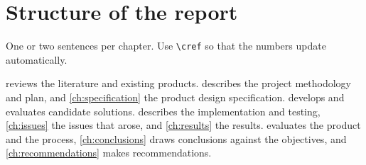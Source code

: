 \section{Structure of the report}
\label{sec:structure}

\begin{guidance}
One or two sentences per chapter. Use \verb|\cref| so that the numbers update
automatically.
\end{guidance}

 reviews the literature and existing products.
 describes the project methodology and plan, and
\cref{ch:specification} the product design specification. 
develops and evaluates candidate solutions. 
describes the implementation and testing, \cref{ch:issues} the issues that
arose, and \cref{ch:results} the results.  evaluates the
product and the process, \cref{ch:conclusions} draws conclusions against the
objectives, and \cref{ch:recommendations} makes recommendations.
